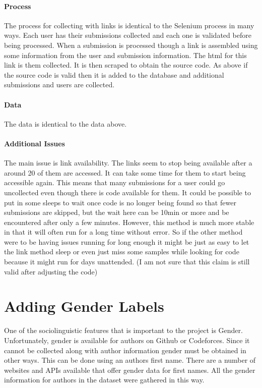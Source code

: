 \documentclass{article}
\begin{document}
\paragraph{Process}
The process for collecting with links is identical to the Selenium process in many ways. Each user has their submissions collected and each one is validated before being processed. When a submission is processed though a link is assembled using some information from the user and submission information. The html for this link is them collected. It is then scraped to obtain the source code. As above if the source code is valid then it is added to the database and additional submissions and users are collected.
\paragraph{Data}
The data is identical to the data above.

\paragraph{Additional Issues}
The main issue is link availability. The links seem to stop being available after a around 20 of them are accessed. It can take some time for them to start being accessible again. This means that many submissions for a user could go uncollected even though there is code available for them. It could be possible to put in some sleeps to wait once code is no longer being found so that fewer submissions are skipped, but the wait here can be 10min or more and be encountered after only a few minutes. However, this method is much more stable in that it will often run for a long time without error. So if the other method were to be having issues running for long enough it might be just as easy to let the link method sleep or even just miss some samples while looking for code because it might run for days unattended. (I am not sure that this claim is still valid after adjusting the code)

\section{Adding Gender Labels}
One of the sociolinguistic features that is important to the project is Gender. Unfortunately, gender is available for authors on Github or Codeforces. Since it cannot be collected along with author information gender must be obtained in other ways. This can be done using an authors first name. There are a number of websites and APIs available that offer gender data for first names. All the gender information for authors in the dataset were gathered in this way.
\end{document}
